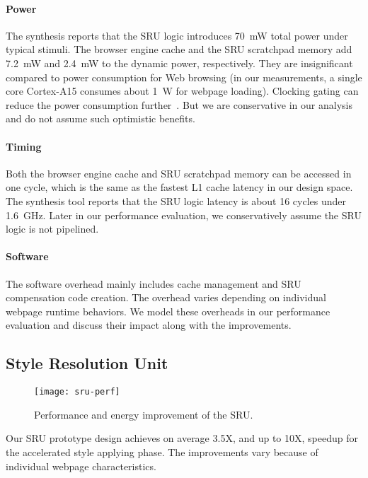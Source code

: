 \paragraph{Power} The synthesis reports that the SRU logic introduces 70~mW total power under typical stimuli. The browser engine cache and the SRU scratchpad memory add 7.2~mW and 2.4~mW to the dynamic power, respectively. They are insignificant compared to power consumption for Web browsing (in our measurements, a single core Cortex-A15 consumes about 1~W for webpage loading). Clocking gating can reduce the power consumption further~\cite{queuethermal}. But we are conservative in our analysis and do not assume such optimistic benefits.

\paragraph{Timing} Both the browser engine cache and SRU scratchpad memory can be accessed in one cycle, which is the same as the fastest L1 cache latency in our design space. The synthesis tool reports that the SRU logic latency is about 16 cycles under 1.6~GHz. Later in our performance evaluation, we conservatively assume the SRU logic is not pipelined.

\paragraph{Software} The software overhead mainly includes cache management and SRU compensation code creation. The overhead varies depending on individual webpage runtime behaviors. We model these overheads in our performance evaluation and discuss their impact along with the improvements.

\subsection{Style Resolution Unit}
\label{sec:arch:eval:sru}

\begin{figure}[t]
\centering
\texttt{[image: sru-perf]}
\caption{\small{Performance and energy improvement of the SRU.}}
\label{fig:sru-perf}
\end{figure}

Our SRU prototype design achieves on average 3.5X, and up to 10X, speedup for the accelerated style applying phase. The improvements vary because of individual webpage characteristics.

